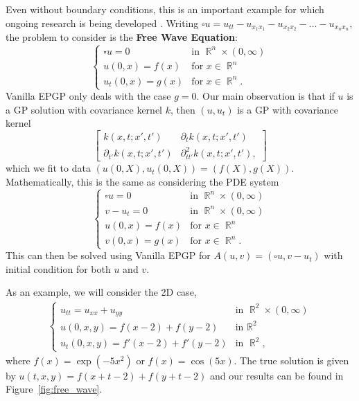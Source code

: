 \documentclass{article} %
\theoremstyle{plain}
\theoremstyle{definition}
\theoremstyle{remark}
\DeclareMathOperator*{\R}{\mathbb{R}}
\begin{document}
Even without boundary conditions, this is an important example for which ongoing research is being developed \citep{henderson2023wave}. Writing $\square u=u_{tt}-u_{x_1x_1}-u_{x_2x_2}-\ldots- u_{x_nx_n}$, the  problem to consider is the \textbf{Free Wave Equation}:
$$
\begin{cases}
    \square u=0&\text{in }\R^{n}\times (0,\infty)\\
    u(0,x)=f(x)&\text{for }x\in\R^{n}\\
    u_t(0,x)=g(x)&\text{for }x\in\R^{n}.
\end{cases}
$$
Vanilla EPGP only deals with the case $g=0$. Our main observation is that if $u$ is a GP solution with covariance kernel $k$, then $(u,u_t)$ is a GP with covariance kernel
$$
\left[
\begin{matrix}
    k(x,t;x',t')&\partial_t k(x,t;x',t')\\
    \partial_{t'}k(x,t;x',t')&\partial^2_{tt'}k(x,t;x',t'),
\end{matrix}
\right]
$$
which we fit to data $(u(0,X),u_t(0,X))=(f(X),g(X))$. Mathematically, this is the same as considering the PDE system
$$
\begin{cases}
    \square u=0&\text{in }\R^{n}\times (0,\infty)\\
v-u_t=0&\text{in }\R^{n}\times (0,\infty)\\
    u(0,x)=f(x)&\text{for }x\in\R^{n}\\
    v(0,x)=g(x)&\text{for }x\in\R^{n}.
\end{cases}
$$
This can then be solved using Vanilla EPGP for $A(u,v)=(\square u,v-u_t)$ with initial condition for both $u$ and $v$.

As an example, we will consider the 2D case,
\begin{align*}
    \begin{cases}
        u_{tt}= u_{xx}+u_{yy}&\text{in }\R^{2}\times (0,\infty)\\
        u(0,x,y)= f(x-2)+f(y-2)&\text{in }\R^2\\
        u_t(0,x,y) = f'(x-2)+f'(y-2)&\text{in }\R^2,
    \end{cases}
\end{align*}
where \(f(x)=\exp(-5x^2)\) or  \(f(x)=\cos(5x)\). The true solution is given by \(u(t,x,y)=f(x+t-2)+f(y+t-2)\) and our results can be found in Figure~\ref{fig:free_wave}.
\end{document}
